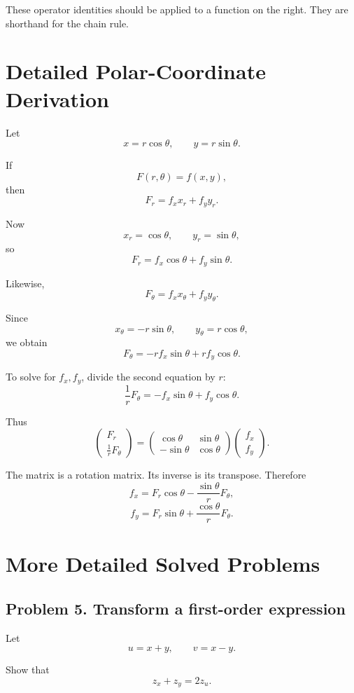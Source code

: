 \documentclass[11pt,oneside]{book}
\theoremstyle{studentthm}
\theoremstyle{definition}
\begin{document}
These operator identities should be applied to a function on the
right. They are shorthand for the chain rule.

\section{Detailed Polar-Coordinate Derivation}

Let
\[
x=r\cos\theta,\qquad y=r\sin\theta.
\]

If
\[
F(r,\theta)=f(x,y),
\]
then
\[
F_r
=
f_xx_r+f_yy_r.
\]

Now
\[
x_r=\cos\theta,
\qquad
y_r=\sin\theta,
\]
so
\[
F_r
=
f_x\cos\theta+f_y\sin\theta.
\]

Likewise,
\[
F_\theta
=
f_xx_\theta+f_yy_\theta.
\]

Since
\[
x_\theta=-r\sin\theta,
\qquad
y_\theta=r\cos\theta,
\]
we obtain
\[
F_\theta
=
-rf_x\sin\theta
+
rf_y\cos\theta.
\]

To solve for \(f_x,f_y\), divide the second equation by \(r\):
\[
\frac1rF_\theta
=
-f_x\sin\theta
+
f_y\cos\theta.
\]

Thus
\[
\begin{pmatrix}
F_r\\
\frac1rF_\theta
\end{pmatrix}
=
\begin{pmatrix}
\cos\theta&\sin\theta\\
-\sin\theta&\cos\theta
\end{pmatrix}
\begin{pmatrix}
f_x\\
f_y
\end{pmatrix}.
\]

The matrix is a rotation matrix. Its inverse is its transpose.
Therefore
\[
f_x
=
F_r\cos\theta
-
\frac{\sin\theta}{r}F_\theta,
\]
\[
f_y
=
F_r\sin\theta
+
\frac{\cos\theta}{r}F_\theta.
\]

\section{More Detailed Solved Problems}

\subsection*{Problem 5. Transform a first-order expression}

Let
\[
u=x+y,\qquad v=x-y.
\]

Show that
\[
z_x+z_y=2z_u.
\]
\end{document}
